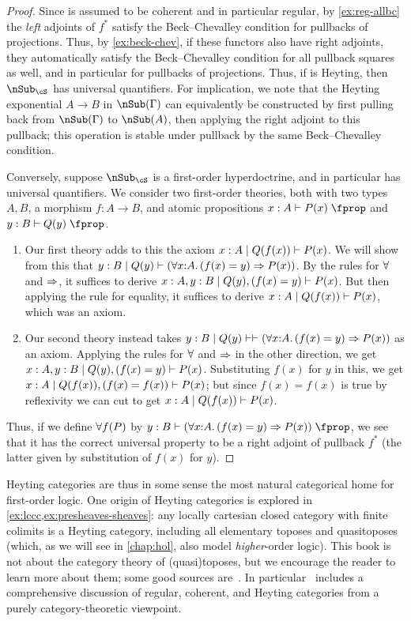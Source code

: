 \begin{proof}
  Since \cS is assumed to be coherent and in particular regular, by \cref{ex:reg-allbc} the \emph{left} adjoints of $f^*$ satisfy the Beck--Chevalley condition for pullbacks of projections.
  Thus, by \cref{ex:beck-chev}, if these functors also have right adjoints, they automatically satisfy the Beck--Chevalley condition for all pullback squares as well, and in particular for pullbacks of projections.
  Thus, if \cS is Heyting, then $\sub_\cS$ has universal quantifiers.
  For implication, we note that the Heyting exponential $A\to B$ in $\sub(\Gamma)$ can equivalently be constructed by first pulling back from $\sub(\Gamma)$ to $\sub(A)$, then applying the right adjoint to this pullback; this operation is stable under pullback by the same Beck--Chevalley condition.

  Conversely, suppose $\sub_\cS$ is a first-order hyperdoctrine, and in particular has universal quantifiers.
  We consider two first-order theories, both with two types $A,B$, a morphism $f:A\to B$, and atomic propositions $x:A \types P(x)\prop$ and $y:B \types Q(y)\prop$.
  \begin{enumerate}
  \item Our first theory adds to this the axiom $x:A \mid Q(f(x))\vdash P(x)$.
    We will show from this that $y:B \cb Q(y) \types (\forall x:A. (f(x)=y) \To P(x))$.
    By the rules for $\all$ and $\Rightarrow$, it suffices to derive $x:A,y:B \mid Q(y), (f(x)=y)\vdash P(x)$.
    But then applying the rule for equality, it suffices to derive $x:A \mid Q(f(x)) \vdash P(x)$, which was an axiom.
  \item Our second theory instead takes $y:B \cb Q(y) \types \types (\forall x:A. (f(x)=y) \To P(x))$ as an axiom.
    Applying the rules for $\all$ and $\Rightarrow$ in the other direction, we get $x:A,y:B \mid Q(y), (f(x)=y) \vdash P(x)$.
    Substituting $f(x)$ for $y$ in this, we get $x:A\mid Q(f(x)), (f(x)=f(x)) \vdash P(x)$; but since $f(x)=f(x)$ is true by reflexivity we can cut to get $x:A \mid Q(f(x))\vdash P(x)$.
  \end{enumerate}
  Thus, if we define $\all f(P)$ by $y:B \types (\forall x:A. (f(x)=y) \To P(x))\prop$, we see that it has the correct universal property to be a right adjoint of pullback $f^*$ (the latter given by substitution of $f(x)$ for $y$).
\end{proof}

Heyting categories are thus in some sense the most natural categorical home for first-order logic.
One origin of Heyting categories is explored in \cref{ex:lccc,ex:presheaves-sheaves}: any locally cartesian closed category with finite colimits is a Heyting category, including all elementary toposes and quasitoposes (which, as we will see in \cref{chap:hol}, also model \emph{higher}-order logic).
This book is not about the category theory of (quasi)toposes, but we encourage the reader to learn more about them; some good sources are~\cite{mm:shv-gl,mclarty:ecat-etop,ptj:elephant,wyler:quasitopoi}.
In particular~\cite{ptj:elephant} includes a comprehensive discussion of regular, coherent, and Heyting categories from a purely category-theoretic viewpoint.



